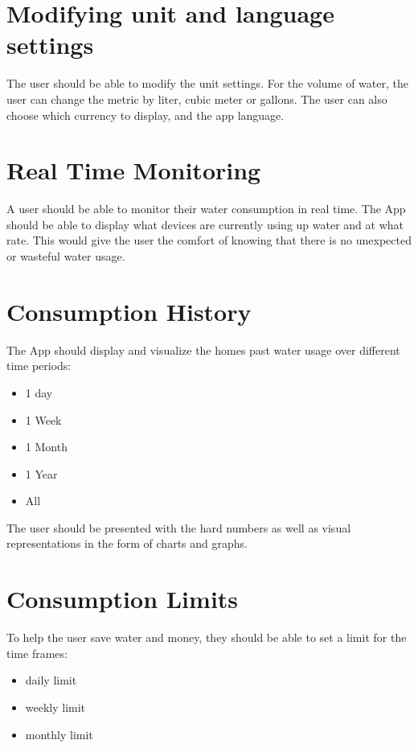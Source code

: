 \documentclass[10pt]{article}
\begin{document}
\section{Modifying unit and language settings}
The user should be able to modify the unit settings. For the volume of water, the user can change the metric by liter, cubic meter or gallons. The user can also choose which currency to display, and the app language.

\section{Real Time Monitoring}
A user should be able to monitor their water consumption in real time. The App should be able to display what devices are currently using up water and at what rate. This would give the user the comfort of knowing that there is no unexpected or wasteful water usage.

\section{Consumption History}
The App should display and visualize the homes past water usage over different time periods:

\begin{itemize}
  \item 1 day

  \item 1 Week

  \item 1 Month

  \item 1 Year

  \item All

\end{itemize}

The user should be presented with the hard numbers as well as visual representations in the form of charts and graphs.

\section{Consumption Limits}
To help the user save water and money, they should be able to set a limit for the time frames:

\begin{itemize}
  \item daily limit

  \item weekly limit

  \item monthly limit

\end{itemize}
\end{document}
